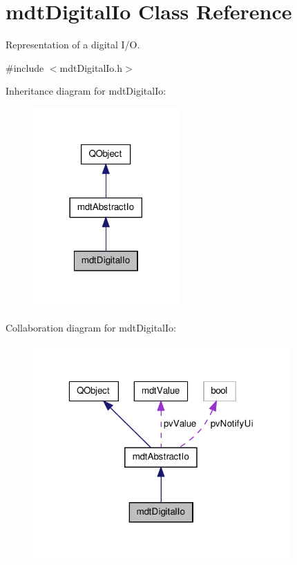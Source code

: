 \hypertarget{classmdt_digital_io}{\section{mdt\-Digital\-Io Class Reference}
\label{classmdt_digital_io}
}


Representation of a digital I/\-O.  




{\ttfamily \#include $<$mdt\-Digital\-Io.\-h$>$}



Inheritance diagram for mdt\-Digital\-Io\-:
\nopagebreak
\begin{figure}[H]
\begin{center}
\leavevmode
\includegraphics[width=158pt]{classmdt_digital_io__inherit__graph}
\end{center}
\end{figure}


Collaboration diagram for mdt\-Digital\-Io\-:
\nopagebreak
\begin{figure}[H]
\begin{center}
\leavevmode
\includegraphics[width=280pt]{classmdt_digital_io__coll__graph}
\end{center}
\end{figure}
